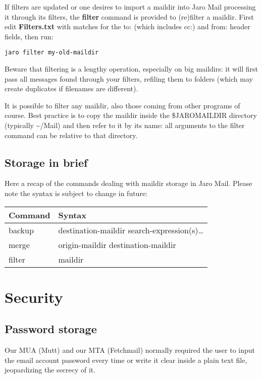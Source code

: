 \documentclass[a4,onecolumn,portrait]{article}
\begin{document}
If filters are updated or one desires to import a maildir into Jaro
Mail processing it through its filters, the \textbf{filter} command is
provided to (re)filter a maildir. First edit \textbf{Filters.txt} with matches for the to: (which includes cc:) and from: header fields, then run:

\begin{verbatim}
jaro filter my-old-maildir
\end{verbatim}

Beware that filtering is a lengthy operation, especially on big
maildirs: it will first pass all messages found through your filters,
refiling them to folders (which may create duplicates if filenames are different).

It is possible to filter any maildir, also those coming from other
programs of course. Best practice is to copy the maildir inside the
\$JAROMAILDIR directory (typically \textasciitilde{}/Mail) and then refer to it by its
name: all arguments to the filter command can be relative to that
directory.
\subsection{Storage in brief}
\label{sec-9-4}

Here a recap of the commands dealing with maildir storage in Jaro Mail. Please note the syntax is subject to change in future:

\begin{center}
\begin{tabular}{ll}
Command & Syntax\\
\hline
backup & destination-maildir search-expression(s)\ldots{}\\
merge & origin-maildir destination-maildir\\
filter & maildir\\
\end{tabular}
\end{center}
\section{Security}
\label{sec-10}

\subsection{Password storage}
\label{sec-10-1}

Our MUA (Mutt) and our MTA (Fetchmail) normally required the user to input the email account password every time or write it clear inside a plain text file, jeopardizing the secrecy of it.
\end{document}
